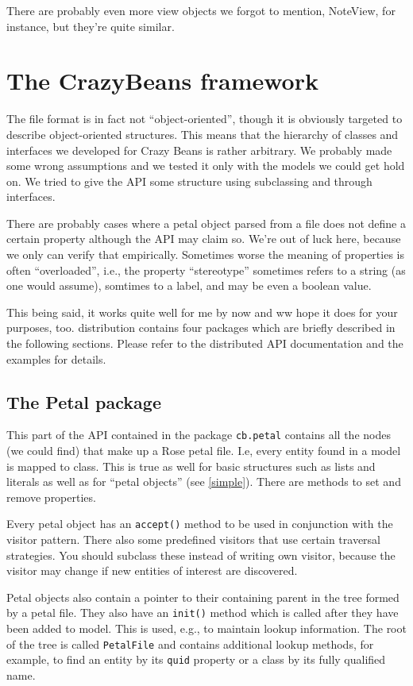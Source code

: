 \documentclass{article}
\begin{document}
There are probably even more view objects we forgot to mention,
NoteView, for instance, but they're quite similar.

\section{The CrazyBeans framework}\label{api}

The file format is in fact not ``object-oriented'', though it is
obviously targeted to describe object-oriented structures. This means
that the hierarchy of classes and interfaces we developed for Crazy
Beans is rather arbitrary. We probably made some wrong assumptions and
we tested it only with the models we could get hold on. We tried to give
the API some structure using subclassing and through interfaces.

There are probably cases where a petal object parsed from a file does
not define a certain property although the API may claim so. We're out of
luck here, because we only can verify that empirically. Sometimes worse
the meaning of properties is often ``overloaded'', i.e., the property
``stereotype'' sometimes refers to a string (as one would assume),
somtimes to a label, and may be even a boolean value.

This being said, it works quite well for me by now and ww hope it does
for your purposes, too. distribution contains four packages which are
briefly described in the following sections. Please refer to the
distributed API documentation and the examples for details.

\subsection{The Petal package}

This part of the API contained in the package \texttt{cb.petal}
contains all the nodes (we could find) that make up a Rose petal
file. I.e, every entity found in a model is mapped to class. This is
true as well for basic structures such as lists and literals as well
as for ``petal objects'' (see \ref{simple}). There are methods to set
and remove properties.

Every petal object has an \texttt{accept()} method to be used in
conjunction with the visitor pattern. There also some predefined
visitors that use certain traversal strategies. You should subclass
these instead of writing own visitor, because the visitor may change
if new entities of interest are discovered.

Petal objects also contain a pointer to their containing parent in the
tree formed by a petal file.  They also have an \texttt{init()} method
which is called after they have been added to model. This is used,
e.g., to maintain lookup information. The root of the tree is called
\texttt{PetalFile} and contains additional lookup methods, for
example, to find an entity by its \texttt{quid} property or a class by
its fully qualified name.
\end{document}
